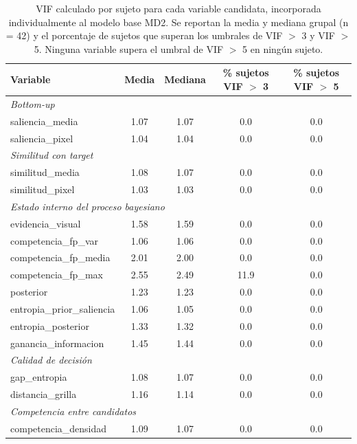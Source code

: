 \begin{table}[H]
\centering
\small
\begin{tabular}{lcccc}
\toprule
\textbf{Variable} & \textbf{Media} & \textbf{Mediana} & \textbf{\% sujetos VIF $>$ 3} & \textbf{\% sujetos VIF $>$ 5} \\
\midrule
\multicolumn{5}{l}{\textit{Bottom-up}} \\
saliencia\_media        & 1.07 & 1.07 & 0.0 & 0.0 \\
saliencia\_pixel        & 1.04 & 1.04 & 0.0 & 0.0 \\
\midrule
\multicolumn{5}{l}{\textit{Similitud con target}} \\
similitud\_media        & 1.08 & 1.07 & 0.0 & 0.0 \\
similitud\_pixel        & 1.03 & 1.03 & 0.0 & 0.0 \\
\midrule
\multicolumn{5}{l}{\textit{Estado interno del proceso bayesiano}} \\
evidencia\_visual       & 1.58 & 1.59 & 0.0 & 0.0 \\
competencia\_fp\_var    & 1.06 & 1.06 & 0.0 & 0.0 \\
competencia\_fp\_media  & 2.01 & 2.00 & 0.0 & 0.0 \\
competencia\_fp\_max    & 2.55 & 2.49 & 11.9 & 0.0 \\
posterior               & 1.23 & 1.23 & 0.0 & 0.0 \\
entropia\_prior\_saliencia & 1.06 & 1.05 & 0.0 & 0.0 \\
entropia\_posterior     & 1.33 & 1.32 & 0.0 & 0.0 \\
ganancia\_informacion   & 1.45 & 1.44 & 0.0 & 0.0 \\
\midrule
\multicolumn{5}{l}{\textit{Calidad de decisión}} \\
gap\_entropia           & 1.08 & 1.07 & 0.0 & 0.0 \\
distancia\_grilla       & 1.16 & 1.14 & 0.0 & 0.0 \\
\midrule
\multicolumn{5}{l}{\textit{Competencia entre candidatos}} \\
competencia\_densidad   & 1.09 & 1.07 & 0.0 & 0.0 \\
\bottomrule
\end{tabular}
\caption{VIF calculado por sujeto para cada variable candidata, 
incorporada individualmente al modelo base MD2. Se reportan la 
media y mediana grupal (n = 42) y el porcentaje de sujetos que 
superan los umbrales de VIF $>$ 3 y VIF $>$ 5. Ninguna variable 
supera el umbral de VIF $>$ 5 en ningún sujeto.}
\label{tab:vif_features}
\end{table}

